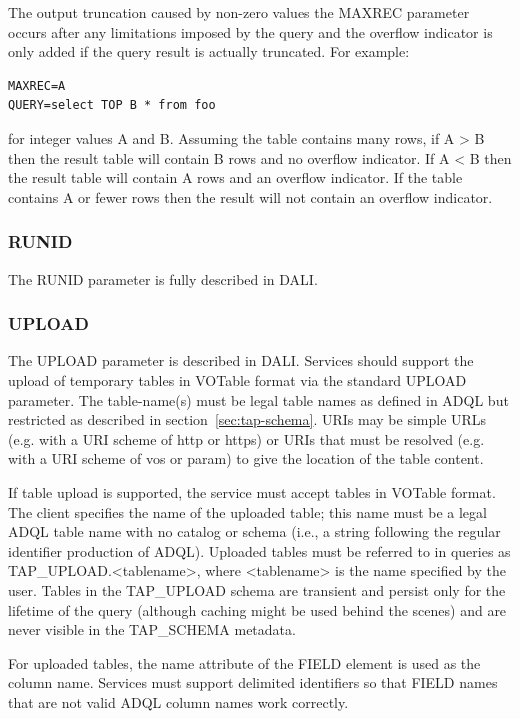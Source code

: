 \documentclass[11pt,letter]{ivoa}
\newcommand{\tapschema}{TAP\_SCHEMA}
\newcommand{\tapupload}{TAP\_UPLOAD}
\newcommand{\tapschema}{\mbox{%
  \relsize{-0.5}TAP\discretionary{-}{}{\kern-2pt\_}SCHEMA}}
\newcommand{\tapupload}{%
  {\relsize{-0.5}TAP\discretionary{-}{}{\kern-2pt\_}UPLOAD}}
\begin{document}
The output truncation caused by non-zero values the MAXREC parameter occurs after any 
limitations imposed by the query and the overflow indicator is only added if 
the query result is actually truncated. For example:

\begin{verbatim}
MAXREC=A
QUERY=select TOP B * from foo
\end{verbatim}

for integer values A and B. Assuming the table contains many rows, if A > B 
then the result table will contain B rows and no overflow indicator. If A < B 
then the result table will contain A rows and an overflow indicator. If the 
table contains A or fewer rows then the result will not contain an overflow 
indicator.

\subsubsection{RUNID}
The RUNID parameter is fully described in DALI.

\subsubsection{UPLOAD}
\label{sec:UPLOAD}

The UPLOAD parameter is described in DALI. Services should support 
the 
upload of temporary tables in VOTable \citep{std:VOTable} format via the standard 
UPLOAD 
parameter. The table-name(s) must be legal table names as defined in 
ADQL \citep{std:ADQL} but restricted as described in section~\ref{sec:tap-schema}. 
URIs may be simple URLs (e.g. with a URI scheme of http or https) or 
URIs that must be resolved (e.g. with a URI scheme of vos or param) to give 
the location of the table content.

If table upload is supported, the service must accept tables in VOTable format. 
The client specifies the name of the uploaded table; this name must be a legal 
ADQL table name with no catalog or schema (i.e., a string following the 
regular identifier production of ADQL). Uploaded tables must be 
referred 
to in queries as \tapupload.<tablename>, where <tablename> is the name
specified by the user. Tables in the \tapupload{} schema are 
transient and persist only for the lifetime of the query (although caching might 
be used behind the scenes) and are never visible in the 
\tapschema{} metadata.

For uploaded tables, the name attribute of the FIELD element is used as the column 
name. Services must support delimited identifiers so that 
FIELD names that are not valid ADQL column names work correctly.
\end{document}
